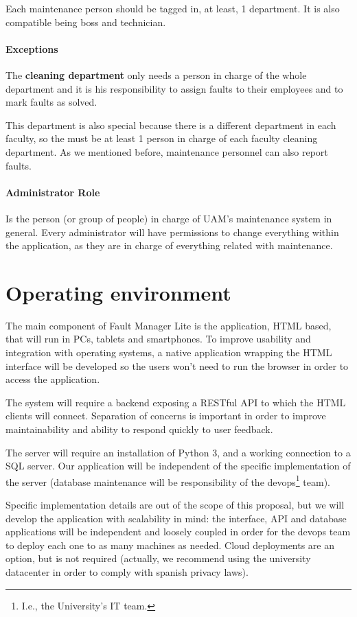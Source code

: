 Each maintenance person should be tagged in, at least, 1 department. It is also compatible being boss and technician.

\paragraph{Exceptions} The \textbf{cleaning department} only needs a person in charge of the whole department and it is his responsibility to assign faults to their employees and to mark faults as solved.

This department is also special because there is a different department in each faculty, so the must be at least 1 person in charge of each faculty cleaning department. As we mentioned before, maintenance personnel can also report faults.

\paragraph{Administrator Role} Is the person (or group of people) in charge of UAM's maintenance system in general. Every administrator will have permissions to change everything within the application, as they are in charge of everything related with maintenance.

\section{Operating environment}

The main component of Fault Manager Lite is the application, HTML based, that will run in PCs, tablets and smartphones. To improve usability and integration with operating systems, a native application wrapping the HTML interface will be developed so the users won't need to run the browser in order to access the application.

The system will require a backend exposing a RESTful API to which the HTML clients will connect. Separation of concerns is important in order to improve maintainability and ability to respond quickly to user feedback.

The server will require an installation of Python 3, and a working connection to a SQL server. Our application will be independent of the specific implementation of the server (database maintenance will be responsibility of the devops\footnote{I.e., the University's IT team.} team).

Specific implementation details are out of the scope of this proposal, but we will develop the application with scalability in mind: the interface, API and database applications will be independent and loosely coupled in order for the devops team to deploy each one to as many machines as needed. Cloud deployments are an option, but is not required (actually, we recommend using the university datacenter in order to comply with spanish privacy laws).

